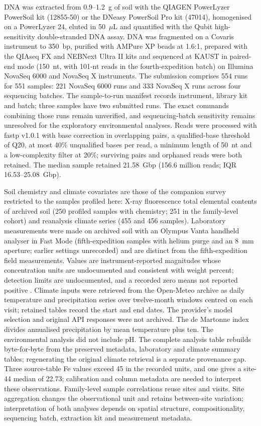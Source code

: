 DNA was extracted from 0.9--1.2~g of soil with the QIAGEN PowerLyzer PowerSoil kit (12855-50) or the
DNeasy PowerSoil Pro kit (47014), homogenised on a PowerLyzer 24, eluted in 50~$\mu$L and quantified
with the Qubit high-sensitivity double-stranded DNA assay. DNA was fragmented on a Covaris instrument
to 350~bp, purified with AMPure XP beads at 1.6:1, prepared with the QIAseq FX and NEBNext Ultra II
kits and sequenced at KAUST in paired-end mode (150~nt, with 101-nt reads in the fourth-expedition batch) on Illumina NovaSeq 6000 and NovaSeq X instruments.
The submission comprises 554 runs for 551 samples: 221 NovaSeq 6000 runs and 333 NovaSeq X runs
across four sequencing batches. The sample-to-run manifest records instrument, library kit and
batch; three samples have two submitted runs. The exact commands combining those runs remain unverified, and sequencing-batch sensitivity remains unresolved for the exploratory environmental analyses. Reads were
processed with fastp v1.0.1 \citep{chen2018fastp} with base correction in overlapping pairs, a
qualified-base threshold of Q20, at most 40\% unqualified bases per read, a minimum length of 50~nt
and a low-complexity filter at 20\%; surviving pairs and orphaned reads were both retained. The
median sample retained 21.58~Gbp (156.6 million reads; IQR 16.53--25.08~Gbp).

Soil chemistry and climate covariates are those of the companion survey restricted to the samples
profiled here: X-ray fluorescence total elemental contents of archived soil (250 profiled samples
with chemistry; 251 in the family-level cohort) and reanalysis climate series (455 and 456 samples).
Laboratory measurements were made on archived soil with an Olympus Vanta handheld analyser in Fast Mode
(fifth-expedition samples with helium purge and an 8~mm aperture; earlier settings unrecorded) and are distinct
from the fifth-expedition field measurements. Values are instrument-reported magnitudes whose concentration units
are undocumented and consistent with weight percent; detection limits are undocumented, and a recorded zero means
not reported positive \citep{rubalkhali_datapaper}. Climate inputs were
retrieved from the Open-Meteo archive as daily temperature and precipitation series over twelve-month
windows centred on each visit; retained tables record the start and end dates. The provider's model
selection and original API responses were not archived. The de Martonne index divides annualised
precipitation by mean temperature plus ten. The environmental analysis did not include pH.
The complete analysis table rebuilds byte-for-byte from the preserved metadata, laboratory and
climate summary tables; regenerating the original climate retrieval is a separate provenance gap. Three source-table Fe values exceed 45 in the recorded units, and one gives a site-44 median of 22.73; calibration and column metadata are needed to interpret these observations. Family-level sample correlations reuse sites and visits. Site aggregation changes the observational unit and retains between-site variation; interpretation of both analyses depends on spatial structure, compositionality, sequencing batch, extraction kit and measurement metadata.

